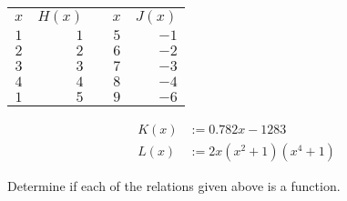 \documentclass[11pt,letterpaper]{article}
\begin{document}
	\begin{minipage}[b]{0.49\textwidth}
	\centering
	\begin{tabular}{c|rcc|r}
	$x$ & $H(x)$ & \hspace{1cm} & $x$ & $J(x)$ \\ \cline{1-2} \cline{4-5}
	$1$ & $1$ & & $5$ & $-1$ \\
	$2$ & $2$ & & $6$ & $-2$ \\
	$3$ & $3$ & & $7$ & $-3$ \\
	$4$ & $4$ & & $8$ & $-4$ \\
	$1$ & $5$ & & $9$ & $-6$
	\end{tabular}
	\end{minipage}
	\begin{minipage}[b]{0.49\textwidth}
	\[
	\begin{aligned}
	K(x)&:= 0.782x - 1283 \\[0.6cm]
	L(x)&:= 2x(x^2 + 1)(x^4 + 1)
	\end{aligned}
	\]
	\end{minipage} \pvspace{0.6cm}
	
Determine if each of the relations given above is a function. \pspace
\end{document}
